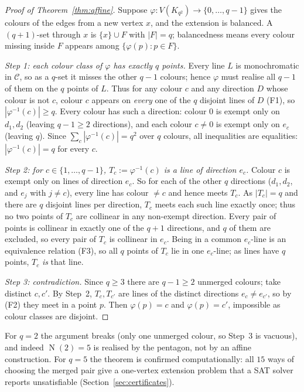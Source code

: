 \documentclass[11pt,reqno]{amsart}
\theoremstyle{definition}
\theoremstyle{remark}
\newcommand{\abs}[1]{\left|#1\right|}
\DeclareMathOperator{\Ncap}{N}
\begin{document}
\begin{proof}[Proof of Theorem~\ref{thm:affine}]
Suppose $\varphi\colon V(K_{q^2})\to\{0,\dots,q-1\}$ gives the colours of the edges
from a new vertex $x$, and the extension is balanced. A $(q+1)$-set through $x$ is
$\{x\}\cup F$ with $\abs F=q$; balancedness means every colour missing inside $F$
appears among $\{\varphi(p):p\in F\}$.

\smallskip
\noindent\emph{Step 1: each colour class of $\varphi$ has exactly $q$ points.}
Every line $L$ is monochromatic in $\mathcal C$, so as a $q$-set it misses the
other $q-1$ colours; hence $\varphi$ must realise all $q-1$ of them on the $q$
points of $L$. Thus for any colour $c$ and any direction $D$ whose colour is not
$c$, colour $c$ appears on \emph{every} one of the $q$ disjoint lines of $D$ (F1),
so $\abs{\varphi^{-1}(c)}\ge q$. Every colour has such a direction: colour $0$ is
exempt only on $d_1,d_2$ (leaving $q-1\ge 2$ directions), and each colour $c\ne 0$
is exempt only on $e_c$ (leaving $q$). Since $\sum_c\abs{\varphi^{-1}(c)}=q^2$ over
$q$ colours, all inequalities are equalities: $\abs{\varphi^{-1}(c)}=q$ for every
$c$.

\smallskip
\noindent\emph{Step 2: for $c\in\{1,\dots,q-1\}$, $T_c:=\varphi^{-1}(c)$ is a line
of direction $e_c$.}
Colour $c$ is exempt only on lines of direction $e_c$. So for each of the other $q$
directions ($d_1,d_2$, and $e_j$ with $j\ne c$), every line has colour $\ne c$ and
hence meets $T_c$. As $\abs{T_c}=q$ and there are $q$ disjoint lines per direction,
$T_c$ meets each such line exactly once; thus no two points of $T_c$ are collinear
in any non-exempt direction. Every pair of points is collinear in exactly one of the
$q+1$ directions, and $q$ of them are excluded, so every pair of $T_c$ is collinear
in $e_c$. Being in a common $e_c$-line is an equivalence relation (F3), so all $q$
points of $T_c$ lie in one $e_c$-line; as lines have $q$ points, $T_c$ \emph{is}
that line.

\smallskip
\noindent\emph{Step 3: contradiction.}
Since $q\ge 3$ there are $q-1\ge 2$ unmerged colours; take distinct $c,c'$. By
Step~2, $T_c,T_{c'}$ are lines of the distinct directions $e_c\ne e_{c'}$, so by
(F2) they meet in a point $p$. Then $\varphi(p)=c$ and $\varphi(p)=c'$, impossible
as colour classes are disjoint.
\end{proof}

For $q=2$ the argument breaks (only one unmerged colour, so Step~3 is vacuous), and
indeed $\Ncap(2)=5$ is realised by the pentagon, not by an affine construction. For
$q=5$ the theorem is confirmed computationally: all $15$ ways of choosing the merged
pair give a one-vertex extension problem that a SAT solver reports unsatisfiable
(Section~\ref{sec:certificates}).
\end{document}
